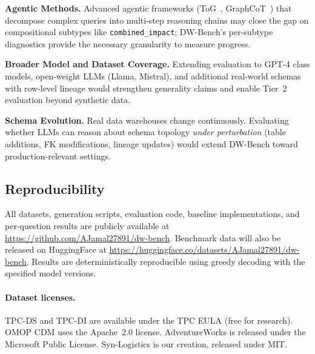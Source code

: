 \textbf{Agentic Methods.}
Advanced agentic frameworks (ToG~\cite{sun2024tog},
GraphCoT~\cite{jin2024graphcot}) that decompose complex queries into
multi-step reasoning chains may close the gap on compositional subtypes
like \texttt{combined\_impact}; DW-Bench's per-subtype diagnostics
provide the necessary granularity to measure progress.

\textbf{Broader Model and Dataset Coverage.}
Extending evaluation to GPT-4 class models, open-weight LLMs (Llama,
Mistral), and additional real-world schemas with row-level lineage would
strengthen generality claims and enable Tier~2 evaluation beyond
synthetic data.

\textbf{Schema Evolution.}
Real data warehouses change continuously.  Evaluating whether LLMs
can reason about schema topology \emph{under perturbation} (table
additions, FK modifications, lineage updates) would extend DW-Bench
toward production-relevant settings.

\subsection{Reproducibility}

All datasets, generation scripts, evaluation code, baseline
implementations, and per-question results are publicly available at
\url{https://github.com/AJamal27891/dw-bench}.  Benchmark data will
also be released on HuggingFace at
\url{https://huggingface.co/datasets/AJamal27891/dw-bench}.
Results are deterministically reproducible
using greedy decoding with the specified model versions.

\paragraph{Dataset licenses.}
TPC-DS and TPC-DI are available under the TPC EULA (free for research).
OMOP CDM uses the Apache~2.0 license.  AdventureWorks is released under
the Microsoft Public License.  Syn-Logistics is our creation, released
under MIT.
